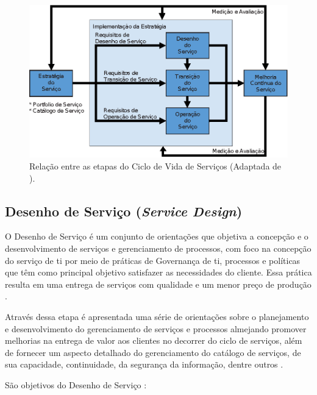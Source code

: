 \begin{figure}[!ht]
  \centering
  \includegraphics[width=.70\textwidth]{figuras/relacao-etapas-itil.eps} 
  \caption{Relação entre as etapas do Ciclo de Vida de Serviços (Adaptada de \cite{abreu2012implantando, servicestrategy}).}
  \label{relacao-etapas-itil} 
\end{figure}

\subsection*{Desenho de Serviço (\textit{Service Design})}

\noindent O Desenho de Serviço é um conjunto de orientações que objetiva a concepção e o desenvolvimento de serviços e gerenciamento de processos, com foco na concepção do serviço de \acrshort{ti} por meio de práticas de Governança de \acrshort{ti}, processos e políticas que têm como principal objetivo satisfazer as necessidades do cliente. Essa prática resulta em uma entrega de serviços com qualidade e um menor preço de produção \cite{itilimplementationfailure, servicedesign}.

Através dessa etapa é apresentada uma série de orientações sobre o planejamento e desenvolvimento do gerenciamento de serviços e processos almejando promover melhorias na entrega de valor aos clientes no decorrer do ciclo de serviços, além de fornecer um aspecto detalhado do gerenciamento do catálogo de serviços, de sua capacidade, continuidade, da segurança da informação, dentre outros \cite{abreu2012implantando}.

\noindent São objetivos do Desenho de Serviço \cite{servicedesign}:

